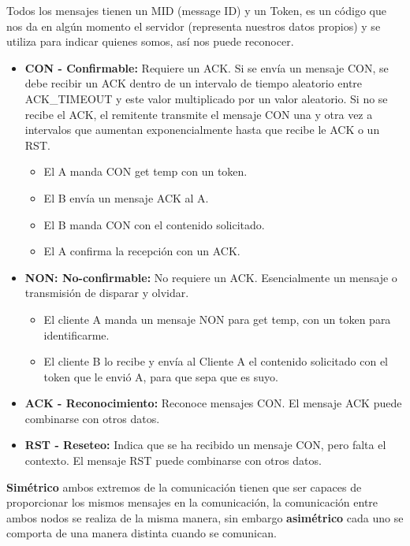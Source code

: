 \documentclass[12pt, twoside, openright]{report} %
\begin{document}
Todos los mensajes tienen un MID (message ID) y un Token, es un código que nos da en algún momento el servidor (representa nuestros datos propios) y se utiliza para indicar quienes somos, así nos puede reconocer.

\begin{itemize}
	\item \textbf{CON - Confirmable:} Requiere un ACK. Si se envía un mensaje CON, se debe recibir un ACK dentro de un intervalo de tiempo aleatorio entre ACK\_TIMEOUT y este valor multiplicado por un valor aleatorio. Si no se recibe el ACK, el remitente transmite el mensaje CON una y otra vez a intervalos que aumentan exponencialmente hasta que recibe le ACK o un RST.
	      \begin{itemize}
		      \item El A manda CON get \/temp con un token.
		      \item El B envía un mensaje ACK al A.
		      \item El B manda CON con el contenido solicitado.
		      \item El A confirma la recepción con un ACK.
	      \end{itemize}
	\item \textbf{NON: No-confirmable:} No requiere un ACK. Esencialmente un mensaje o transmisión de disparar y olvidar.
	      \begin{itemize}
		      \item El cliente A manda un mensaje NON para get \/temp, con un token para identificarme.
		      \item El cliente B lo recibe y envía al Cliente A el contenido solicitado con el token que le envió A, para que sepa que es suyo.
	      \end{itemize}
	\item \textbf{ACK - Reconocimiento:} Reconoce mensajes CON. El mensaje ACK puede combinarse con otros datos.

	\item \textbf{RST - Reseteo:} Indica que se ha recibido un mensaje CON, pero falta el contexto. El mensaje RST puede combinarse con otros datos.
\end{itemize}

\textbf{Simétrico} ambos extremos de la comunicación tienen que ser capaces de proporcionar los mismos mensajes en la comunicación, la comunicación entre ambos nodos se realiza de la misma manera, sin embargo \textbf{asimétrico} cada uno se comporta de una manera distinta cuando se comunican.
\end{document}
